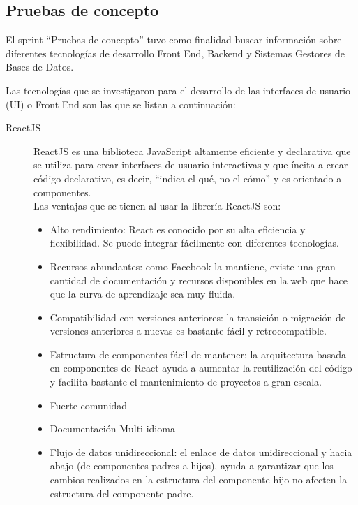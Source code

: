 \subsection{Pruebas de concepto}
    El sprint ``Pruebas de concepto'' tuvo como finalidad buscar información sobre diferentes tecnologías de desarrollo Front End, Backend y Sistemas Gestores de Bases de Datos. 

    Las tecnologías que se investigaron para el desarrollo de las interfaces de usuario (UI) o Front End son las que se listan a continuación:
    \begin{description}
        \item[ReactJS] ReactJS es una biblioteca JavaScript altamente eficiente y declarativa que se utiliza para crear interfaces de usuario interactivas y que íncita a crear código declarativo, es decir, “indica el qué, no el cómo” y es orientado a componentes. \cite{sa}\\
        Las ventajas que se tienen al usar la librería ReactJS son:
        \begin{itemize}
            \item Alto rendimiento: React es conocido por su alta eficiencia y flexibilidad. Se puede integrar fácilmente con diferentes tecnologías.
            \item Recursos abundantes: como Facebook la mantiene, existe una gran cantidad de documentación y recursos disponibles en la web que hace que la curva de aprendizaje sea muy fluida.
            \item Compatibilidad con versiones anteriores: la transición o migración de versiones anteriores a nuevas es bastante fácil y retrocompatible.
            \item Estructura de componentes fácil de mantener: la arquitectura basada en componentes de React ayuda a aumentar la reutilización del código y facilita bastante el mantenimiento de proyectos a gran escala.
            \item Fuerte comunidad
            \item Documentación Multi idioma
            \item Flujo de datos unidireccional: el enlace de datos unidireccional y hacia abajo (de componentes padres a hijos), ayuda a garantizar que los cambios realizados en la estructura del componente hijo no afecten la estructura del componente padre.
            
        \end{itemize}


\end{description}
